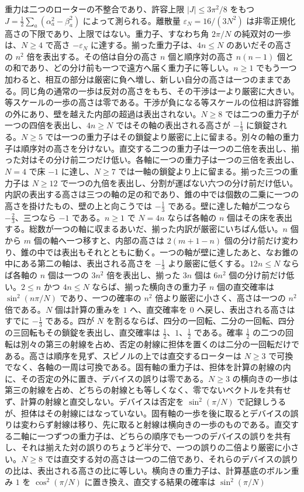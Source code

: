 \documentclass[a4paper]{article}
\begin{document}
重力は二つのローターの不整合であり、許容上限 $|J|\le 3\pi^2/8$ をもつ $J=\frac12\sum_a(\alpha_a^2-\beta_a^2)$ によって測られる。離散量 $\varepsilon_N=16/(3N^2)$ は非零正規化高さの下限であり、上限ではない。重力子、すなわち角 \(2\pi/N\) の純双対の一歩は、\(N\ge 4\) で高さ \(-\varepsilon_N\) に達する。揃った重力子は、\(4n\le N\) のあいだその高さの \(n^2\) 倍を表出する。その倍は自分の高さ \(n\) 個と順序対の高さ \(n(n-1)\) 個との和であり、どの分け前も一つで遠方へ届く重力子に等しい。\(n\ge 1\) でもう一つ加わると、相互の部分は厳密に負へ増し、新しい自分の高さは一つのままである。同じ角の通常の一歩は反対の高さをもち、その干渉は一より厳密に大きい。等スケールの一歩の高さは零である。干渉が負になる等スケールの位相は許容錐の外にあり、壁を越えた内部の超過は表出されない。\(N\ge 8\) では二つの重力子が一つの四倍を表出し、\(4n\ge N\) ではその軸の表出される高さが \(-\frac13\) に鎖錠される。\(N\ge 5\) では一つの重力子はその鎖錠より厳密に上に留まる。別々の軸の重力子は順序対の高さを分けない。直交する二つの重力子は一つの二倍を表出し、揃った対はその分け前二つだけ低い。各軸に一つの重力子は一つの三倍を表出し、\(N=4\) で床 \(-1\) に達し、\(N\ge 7\) では一軸の鎖錠より上に留まる。揃った三つの重力子は \(N\ge 12\) で一つの九倍を表出し、分割が運ばない六つの分け前だけ低い。内訳の表出する高さは三つの軸の足の和であり、錐の中では個数の二乗に一つの高さを掛けたもの、壁の上と向こうでは \(-\frac13\) である。壁に達した軸が二つなら \(-\frac23\)、三つなら \(-1\) である。\(n\ge 1\) で \(N=4n\) ならば各軸の \(n\) 個はその床を表出する。総数が一つの軸に収まるあいだ、揃った内訳が厳密にいちばん低い。\(n\) 個から \(m\) 個の軸へ一つ移すと、内部の高さは \(2(m+1-n)\) 個の分け前だけ変わり、錐の中では表出もそれとともに動く。一つの軸が壁に達したあと、なお錐の中にある第二の軸は、表出される高さを \(-\frac13\) より厳密に低くする。\(12n\le N\) ならば各軸の \(n\) 個は一つの \(3n^2\) 倍を表出し、揃った \(3n\) 個は \(6n^2\) 個の分け前だけ低い。\(2\le n\) かつ \(4n\le N\) ならば、揃った横向きの重力子 \(n\) 個の直交確率は \(\sin^2(n\pi/N)\) であり、一つの確率の \(n^2\) 倍より厳密に小さく、高さは一つの \(n^2\) 倍である。\(N\) 個は計算の重みを \(1\) へ、直交確率を \(0\) へ戻し、表出される高さはすでに \(-\frac13\) である。四が \(N\) を割るならば、四分の一回転、二分の一回転、四分の三回転もその鎖錠を表出し、直交確率は \(\frac12\)、\(1\)、\(\frac12\) である。確率 \(\frac12\) の二つの回転は別々の第三の射線を占め、否定の射線に担体を置くのは二分の一回転だけである。高さは順序を見ず、スピノルの上では直交するローターは \(N\ge 3\) で可換でなく、各軸の一周は可換である。固有軸の重力子は、担体を計算の射線の内に、その否定の外に置き、デバイスの誤りは零である。\(N\ge 3\) の横向きの一歩は第三の射線を占め、どちらの射線とも等しくなく、零でないベクトルを共有せず、計算の射線と直交しない。デバイスは否定を \(\sin^2(\pi/N)\) で記録しうるが、担体はその射線にはなっていない。固有軸の一歩を後に取るとデバイスの誤りは変わらず射線は移り、先に取ると射線は横向きの一歩のものである。直交する二軸に一つずつの重力子は、どちらの順序でも一つのデバイスの誤りを共有し、それは揃えた対の誤りのちょうど半分で、一つの誤りの二倍より厳密に小さい。\(N\ge 8\) では直交する対の高さは一つの二倍であり、それらのデバイスの誤りの比は、表出される高さの比に等しい。横向きの重力子は、計算基底のボルン重み \(1\) を \(\cos^2(\pi/N)\) に置き換え、直交する結果の確率は \(\sin^2(\pi/N)\) 
\end{document}
